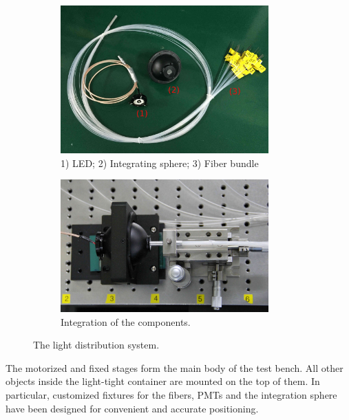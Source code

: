 \documentclass{nst}
\begin{document}
\begin{figure}[!htb]
	
	\begin{subfigure}[t]{80mm}
		\includegraphics[width=80mm]{fibre_led_insphere_crop.jpg}
		\caption{1) LED; 2) Integrating sphere; 3) Fiber bundle}
		\label{fig:FIG3_a}
	\end{subfigure}
	\begin{subfigure}[t]{80mm}
		\includegraphics[width=80mm]{light_source1_crop.jpg}
		\caption{Integration of the components.}
		\label{fig:FIG3_b}
	\end{subfigure}
	
	\caption{The light distribution system.}
	\label{fig:FIG_tmp}
\end{figure}

The motorized and fixed stages form the main body of the test bench.
All other objects inside the light-tight container are mounted on the top of them.
In particular, customized fixtures for the fibers, PMTs and the integration sphere have been designed for convenient and accurate positioning.

\end{document}
